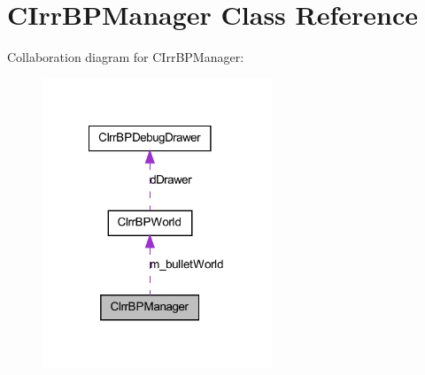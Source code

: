 \hypertarget{class_c_irr_b_p_manager}{
\section{CIrrBPManager Class Reference}
\label{class_c_irr_b_p_manager}
}


Collaboration diagram for CIrrBPManager:\nopagebreak
\begin{figure}[H]
\begin{center}
\leavevmode
\includegraphics[width=194pt]{class_c_irr_b_p_manager__coll__graph}
\end{center}
\end{figure}
